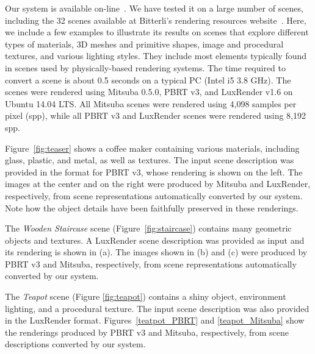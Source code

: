 Our system is available on-line~\cite{sceneConverter}.
We have tested it on a large number of scenes, including the 32 scenes available
at Bitterli's rendering resources website~\cite{resources16}. 
Here, we include a few examples to illustrate its results on scenes that explore different 
types of materials, 3D meshes and primitive shapes, image and 
procedural textures, and various lighting styles. They include most elements typically found in scenes used by physically-based rendering systems.  The time required to convert a scene is about 0.5 seconds on a typical PC (Intel i5 3.8 GHz).
% 
%
The scenes were rendered using Mitsuba 0.5.0, PBRT v3, and LuxRender v1.6 on 
Ubuntu 14.04 LTS. All Mitsuba scenes were rendered using  4,098 samples per pixel (spp), while all PBRT v3 and LuxRender scenes were rendered using 8,192 spp. 

Figure~\ref{fig:teaser} shows a coffee maker containing various materials, including glass, plastic, and metal, as well as textures. The input scene description was provided in the format for PBRT v3, whose rendering is shown on the left. The images at the center and on the right were produced by Mitsuba and LuxRender, respectively, from scene representations automatically converted by our system. 
Note how the object details have been faithfully preserved in these renderings.

The \textit{Wooden Staircase} scene (Figure~\ref{fig:staircase}) contains many geometric objects and textures. 
A LuxRender scene description was provided as input and its rendering is shown in (a). The images shown in (b) and (c) were produced 
by PBRT v3 and Mitsuba, respectively, from scene representations automatically converted by our system. 

The \textit{Teapot} scene (Figure \ref{fig:teapot}) contains a shiny object, environment lighting, and a procedural texture. The input scene description was also provided in the LuxRender format. Figures~\ref{teatpot_PBRT} and \ref{teapot_Mitsuba} show the renderings produced by PBRT v3 and Mitsuba, respectively, from scene descriptions converted by our system.


